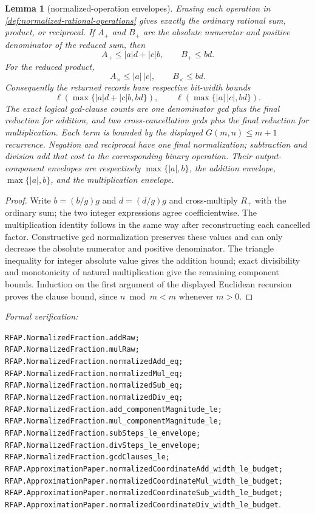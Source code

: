 \documentclass[11pt]{article}
\newtheorem{lemma}[lemma]{Lemma}
\newcommand{\leanref}[1]{\par\smallskip\noindent
  \emph{Formal verification:}\par\nobreak
  {\raggedright\nolinkurl{#1}.\par}}
\begin{document}
\begin{lemma}[normalized-operation envelopes]
\label{lem:normalized-operation-envelopes}
Erasing each operation in \cref{def:normalized-rational-operations} gives
exactly the ordinary rational sum, product, or reciprocal.  If $A_+$ and
$B_+$ are the absolute numerator and positive denominator of the reduced
sum, then
\[
 A_+\le |a|d+|c|b,
 \qquad B_+\le bd.
\]
For the reduced product,
\[
 A_\times\le |a|\,|c|,
 \qquad B_\times\le bd.
\]
Consequently the returned records have respective bit-width bounds
\[
 \ell\!\left(\max\{|a|d+|c|b,bd\}\right),
 \qquad
 \ell\!\left(\max\{|a|\,|c|,bd\}\right).
\]
The exact logical gcd-clause counts are one denominator gcd plus the final
reduction for addition, and two cross-cancellation gcds plus the final
reduction for multiplication.  Each term is bounded by the displayed
$G(m,n)\le m+1$ recurrence.  Negation and reciprocal have one final
normalization; subtraction and division add that cost to the corresponding
binary operation.  Their output-component envelopes are respectively
$\max\{|a|,b\}$, the addition envelope, $\max\{|a|,b\}$, and the
multiplication envelope.
\end{lemma}

\begin{proof}
Write $b=(b/g)g$ and $d=(d/g)g$ and cross-multiply $R_+$ with the ordinary
sum; the two integer expressions agree coefficientwise.  The multiplication
identity follows in the same way after reconstructing each cancelled factor.
Constructive gcd normalization preserves these values and can only decrease
the absolute numerator and positive denominator.  The triangle inequality
for integer absolute value gives the addition bound; exact divisibility and
monotonicity of natural multiplication give the remaining component bounds.
Induction on the first argument of the displayed Euclidean recursion proves
the clause bound, since $n\bmod m<m$ whenever $m>0$.
\end{proof}

\leanref{RFAP.NormalizedFraction.addRaw;
RFAP.NormalizedFraction.mulRaw;
RFAP.NormalizedFraction.normalizedAdd_eq;
RFAP.NormalizedFraction.normalizedMul_eq;
RFAP.NormalizedFraction.normalizedSub_eq;
RFAP.NormalizedFraction.normalizedDiv_eq;
RFAP.NormalizedFraction.add_componentMagnitude_le;
RFAP.NormalizedFraction.mul_componentMagnitude_le;
RFAP.NormalizedFraction.subSteps_le_envelope;
RFAP.NormalizedFraction.divSteps_le_envelope;
RFAP.NormalizedFraction.gcdClauses_le;
RFAP.ApproximationPaper.normalizedCoordinateAdd_width_le_budget;
RFAP.ApproximationPaper.normalizedCoordinateMul_width_le_budget;
RFAP.ApproximationPaper.normalizedCoordinateSub_width_le_budget;
RFAP.ApproximationPaper.normalizedCoordinateDiv_width_le_budget}
\end{document}

